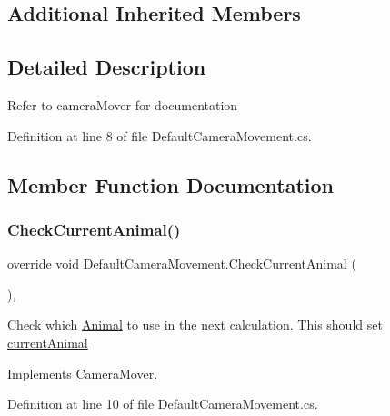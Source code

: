 \subsection*{Additional Inherited Members}


\subsection{Detailed Description}
Refer to camera\+Mover for documentation 



Definition at line 8 of file Default\+Camera\+Movement.\+cs.



\subsection{Member Function Documentation}
\mbox{\label{class_default_camera_movement_a27024061b5779124b7fac73acaed7c1d}} 
\subsubsection{\texorpdfstring{Check\+Current\+Animal()}{CheckCurrentAnimal()}}
{\footnotesize\ttfamily override void Default\+Camera\+Movement.\+Check\+Current\+Animal (\begin{DoxyParamCaption}{ }\end{DoxyParamCaption})\hspace{0.3cm}{\ttfamily [protected]}, {\ttfamily [virtual]}}



Check which \mbox{\hyperlink{class_animal}{Animal}} to use in the next calculation. This should set \mbox{\hyperlink{class_camera_mover_a8b863da058e5a1984fd686e09ee2689f}{current\+Animal}} 



Implements \mbox{\hyperlink{class_camera_mover_ae1a5b4f8f531adf79cdea73c27ca8203}{Camera\+Mover}}.



Definition at line 10 of file Default\+Camera\+Movement.\+cs.

\mbox{\label{class_default_camera_movement_ad456298793af765ca6218d6951dd4973}} 
